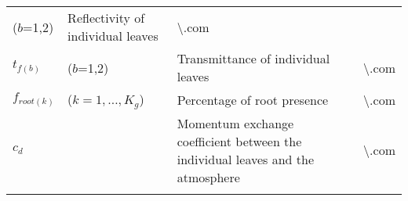 \begin{longtable}[]{@{}llll@{}}
\begin{minipage}[t]{0.22\columnwidth}
(\(b\)=1,2)\strut
\end{minipage} & \begin{minipage}[t]{0.22\columnwidth}\raggedright
Reflectivity of individual leaves\strut
\end{minipage} & \begin{minipage}[t]{0.22\columnwidth}\raggedright
\textbackslash.com\strut
\end{minipage}\tabularnewline
\begin{minipage}[t]{0.22\columnwidth}\raggedright
\(t_{f(b)}\)\strut
\end{minipage} & \begin{minipage}[t]{0.22\columnwidth}\raggedright
(\(b\)=1,2)\strut
\end{minipage} & \begin{minipage}[t]{0.22\columnwidth}\raggedright
Transmittance of individual leaves\strut
\end{minipage} & \begin{minipage}[t]{0.22\columnwidth}\raggedright
\textbackslash.com\strut
\end{minipage}\tabularnewline
\begin{minipage}[t]{0.22\columnwidth}\raggedright
\(f_{root(k)}\)\strut
\end{minipage} & \begin{minipage}[t]{0.22\columnwidth}\raggedright
(\(k=1,\ldots,K_g\))\strut
\end{minipage} & \begin{minipage}[t]{0.22\columnwidth}\raggedright
Percentage of root presence\strut
\end{minipage} & \begin{minipage}[t]{0.22\columnwidth}\raggedright
\textbackslash.com\strut
\end{minipage}\tabularnewline
\begin{minipage}[t]{0.22\columnwidth}\raggedright
\(c_d\)\strut
\end{minipage} & \begin{minipage}[t]{0.22\columnwidth}\raggedright
\strut
\end{minipage} & \begin{minipage}[t]{0.22\columnwidth}\raggedright
Momentum exchange coefficient between the individual leaves and the
atmosphere\strut
\end{minipage} & \begin{minipage}[t]{0.22\columnwidth}\raggedright
\textbackslash.com\strut
\end{minipage}\tabularnewline
\begin{minipage}[t]{0.22\columnwidth}\raggedright

\end{minipage}
\end{longtable}
